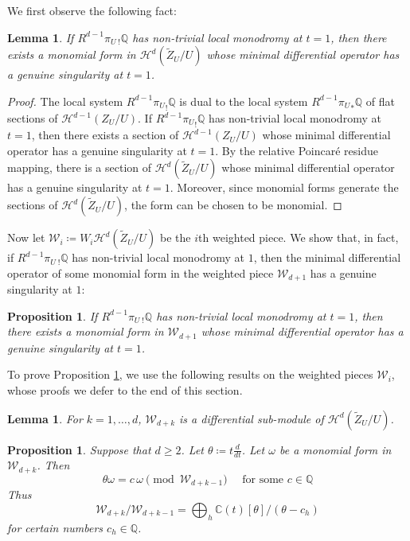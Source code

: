 \documentclass[11pt, reqno]{amsart}
\theoremstyle{plain}
\newtheorem{lem}[thm]{Lemma}
\newtheorem{prop}[thm]{Proposition}
\theoremstyle{definition}
\newcommand{\CC}{\mathbb{C}}
\newcommand{\QQ}{\mathbb{Q}}
\begin{document}
We first observe the following fact:
\begin{lem}\label{lem:genuine-sing}
If $R^{d-1}\pi_{U \; !} \QQ$ has non-trivial local monodromy at $t=1$, then there exists a monomial form in $\mathcal{H}^{d}(\tilde{Z}_U/U)$ whose minimal differential operator has a genuine singularity at $t=1$. 
\end{lem}
\begin{proof}
The local system $R^{d-1}{\pi_{U}}_!\QQ$ is dual to the local system $R^{d-1}{\pi_{U}}_* \QQ$ of flat sections of $\mathcal{H}^{d-1}(Z_U/U)$. If  $R^{d-1}{\pi_{U}}_!\QQ$ has non-trivial local monodromy at $t=1$, then there exists a section of $\mathcal{H}^{d-1}(Z_U/U)$ whose minimal differential operator has a genuine singularity at $t=1$.
By the relative Poincar\'e residue mapping, there is a section of $\mathcal{H}^{d}({\tilde{Z}_U/U})$ whose minimal differential operator has a genuine singularity at $t=1$. Moreover, since monomial forms generate the sections of $\mathcal{H}^{d}({\tilde{Z}_U/U})$, the form can be chosen to be monomial.
\end{proof}



Now let $\mathcal{W}_i \coloneqq  {W}_{i} \mathcal{H}^d(\widetilde{Z}_U/U)$ be the $i$th weighted piece. We show that, in fact, if $R^{d-1}\pi_{U \; !} \QQ$ has non-trivial local monodromy at $1$, then the minimal differential operator of some monomial form in the weighted piece $\mathcal{W}_{d+1}$ has a genuine singularity at $1$: 

\begin{prop}\label{prop:coh-form-top} If $R^{d-1}\pi_{U \; !} \QQ$ has non-trivial local monodromy at $t=1$,
then there exists a monomial form in $\mathcal{W}_{d+1}$ whose minimal differential operator has a genuine singularity at $t=1$. 
\end{prop}
\smallskip



To prove Proposition \ref{prop:coh-form-top}, we use the following results on the weighted pieces $\mathcal{W}_i$, whose proofs we defer to the end of this section. 

\begin{lem}\label{lem:weight-submodule}
    For $k=1, \dots, d$, $\mathcal{W}_{d+k}$  is a differential sub-module of  $\mathcal{H}^d(\widetilde{Z}_U/U)$.
\end{lem}


\begin{prop}\label{lem:quotients-Gm}
Suppose that $d \geq 2$. Let $\theta \coloneqq t \frac{d}{dt}$.   Let $\omega$ be a monomial form in $\mathcal{W}_{d+k}$. Then
\[
\theta \omega = c \, \omega \pmod{\mathcal{W}_{d+k-1}} \quad \text{ for some $c \in \QQ$}
\]
Thus
\begin{equation} \label{eq:W-decomposition-t}
     \mathcal{W}_{d+k}/\mathcal{W}_{d+k-1} = \bigoplus_{h} \CC(t)[\theta]/(\theta-c_h)
\end{equation}
for certain numbers $c_h \in \QQ$. 
\end{prop}
\smallskip
\end{document}
